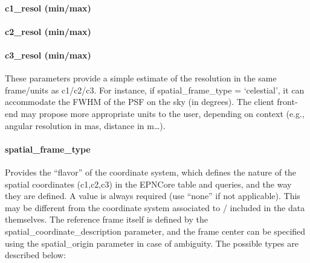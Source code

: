 \documentclass[11pt,a4paper]{ivoa}
\begin{document}
\paragraph{c1\_resol (min/max)}

\paragraph{c2\_resol (min/max)}
\vspace{-15pt}
\paragraph{c3\_resol (min/max)}
\vspace{-15pt}
These parameters provide a simple estimate of the resolution in the same
frame/units as c1/c2/c3. For instance, if spatial\_frame\_type =
`celestial', it can accommodate the FWHM of the PSF on the sky (in
degrees). The client front-end may propose more appropriate units to the
user, depending on context (e.g., angular resolution in mas, distance
in m\dots).

\paragraph{spatial\_frame\_type}

Provides the ``flavor'' of the coordinate system, which defines the nature
of the spatial coordinates (c1,c2,c3) in the EPNCore table and queries,
and the way they are defined. A value is always required (use ``none''
if not applicable). This may be different from the coordinate system associated to /
included in the data themselves. The reference frame itself is defined by
the spatial\_coordinate\_description parameter, and the frame center can
be specified using the spatial\_origin parameter in case of ambiguity.
The possible types are described below:
\end{document}
